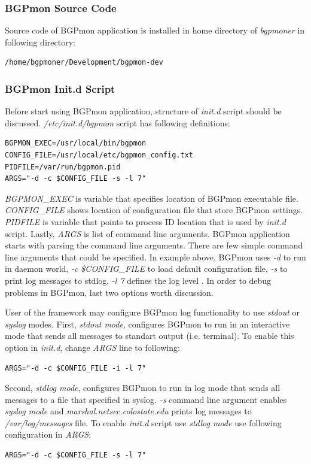 \subsubsection{BGPmon Source Code}
Source code of BGPmon application is installed in home directory of \emph{bgpmoner} in following directory:

\begin{verbatim}
/home/bgpmoner/Development/bgpmon-dev
\end{verbatim}

\subsubsection{BGPmon Init.d Script}

Before start using BGPmon application, structure of \emph{init.d} script should be discussed.   \emph{/etc/init.d/bgpmon} script has following definitions:

\begin{verbatim}
BGPMON_EXEC=/usr/local/bin/bgpmon 
CONFIG_FILE=/usr/local/etc/bgpmon_config.txt
PIDFILE=/var/run/bgpmon.pid
ARGS="-d -c $CONFIG_FILE -s -l 7"
\end{verbatim}

\emph{BGPMON\_EXEC} is variable that specifies location of BGPmon executable file. \emph{CONFIG\_FILE} shows location of configuration file that store BGPmon settings.  \emph{PIDFILE} is variable that points to process ID location that is used by \emph{init.d} script. Lastly, \emph{ARGS} is list of command line arguments.   BGPmon application starts with parsing the command line arguments. There are few simple command line arguments that could be specified. In example above, BGPmon uses \emph{-d} to run in daemon world,  \emph{-c \$CONFIG\_FILE} to load default configuration file, \emph{-s} to print log messages to stdlog, \emph{-l 7} defines the log level . In order to debug problems in BGPmon, last two options worth  discussion.

User of the framework may configure BGPmon log functionality to use  \emph{stdout} or \emph{syslog} modes.  First, \emph{stdout mode}, configures BGPmon to run  in an interactive mode that sends all messages to standart output (i.e. terminal).  To enable this option in \emph{init.d}, change \emph{ARGS} line to following:
\begin{verbatim}
ARGS="-d -c $CONFIG_FILE -i -l 7"
\end{verbatim}

Second, \emph{stdlog mode}, configures BGPmon to run in log mode that sends all messages to a file that specified in syslog. \emph{-s} command line argument enables \emph{syslog mode} and \emph{marshal.netsec.colostate.edu} prints log messages to \emph{/var/log/messages} file. To enable \emph{init.d} script use \emph{stdlog mode} use following configuration in \emph{ARGS}:
\begin{verbatim}
ARGS="-d -c $CONFIG_FILE -s -l 7"
\end{verbatim}

